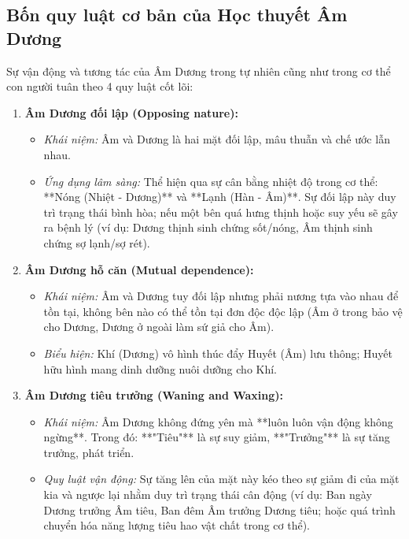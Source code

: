 \subsection{Bốn quy luật cơ bản của Học thuyết Âm Dương}

Sự vận động và tương tác của Âm Dương trong tự nhiên cũng như trong cơ thể con người tuân theo 4 quy luật cốt lõi:

\begin{enumerate}
    \item \textbf{Âm Dương đối lập (Opposing nature):}
    \begin{itemize}
        \item \textit{Khái niệm:} Âm và Dương là hai mặt đối lập, mâu thuẫn và chế ước lẫn nhau.
        \item \textit{Ứng dụng lâm sàng:} Thể hiện qua sự cân bằng nhiệt độ trong cơ thể: **Nóng (Nhiệt - Dương)** và **Lạnh (Hàn - Âm)**. Sự đối lập này duy trì trạng thái bình hòa; nếu một bên quá hưng thịnh hoặc suy yếu sẽ gây ra bệnh lý (ví dụ: Dương thịnh sinh chứng sốt/nóng, Âm thịnh sinh chứng sợ lạnh/sợ rét).
    \end{itemize}

    \item \textbf{Âm Dương hỗ căn (Mutual dependence):}
    \begin{itemize}
        \item \textit{Khái niệm:} Âm và Dương tuy đối lập nhưng phải nương tựa vào nhau để tồn tại, không bên nào có thể tồn tại đơn độc độc lập (Âm ở trong bảo vệ cho Dương, Dương ở ngoài làm sứ giả cho Âm).
        \item \textit{Biểu hiện:} Khí (Dương) vô hình thúc đẩy Huyết (Âm) lưu thông; Huyết hữu hình mang dinh dưỡng nuôi dưỡng cho Khí.
    \end{itemize}

    \item \textbf{Âm Dương tiêu trưởng (Waning and Waxing):}
    \begin{itemize}
        \item \textit{Khái niệm:} Âm Dương không đứng yên mà **luôn luôn vận động không ngừng**. Trong đó: **"Tiêu"** là sự suy giảm, **"Trưởng"** là sự tăng trưởng, phát triển.
        \item \textit{Quy luật vận động:} Sự tăng lên của mặt này kéo theo sự giảm đi của mặt kia và ngược lại nhằm duy trì trạng thái cân động (ví dụ: Ban ngày Dương trưởng Âm tiêu, Ban đêm Âm trưởng Dương tiêu; hoặc quá trình chuyển hóa năng lượng tiêu hao vật chất trong cơ thể).
    \end{itemize}


\end{enumerate}
